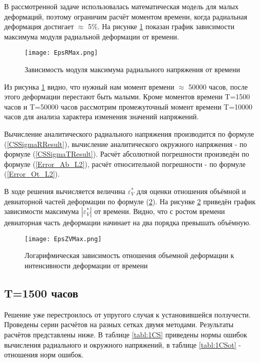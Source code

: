 \documentclass[a4paper,14pt]{extarticle}
\begin{document}
В рассмотренной задаче использовалась математическая модель для малых деформаций, поэтому ограничим расчёт моментом времени, когда радиальная деформация достигает $\approx$ 5$\%$. На рисунке \ref{EpsRMax} показан график зависимости максимума модуля радиальной деформации от времени. 
\newpage

\begin{figure}[ht]
\begin{center}
\texttt{[image: EpsRMax.png]}
\caption{Зависимость модуля максимума радиального напряжения от времени}
\label{EpsRMax}
\end{center}
\end{figure}

Из рисунка \ref{EpsRMax} видно, что нужный нам момент времени $\approx$ 50000 часов, после этого деформации перестают быть малыми. Кроме моментов времени T=1500 часов и T=50000 часов рассмотрим промежуточный момент времени T=10000 часов для анализа характера изменения значений напряжений.

Вычисление аналитического радиального напряжения производится по формуле (\ref{CSSigmaRResult}), вычисление аналитического окружного напряжения - по формуле (\ref{CSSigmaTResult}). Расчёт абсолютной погрешности произведён по формуле (\ref{Error_Ab_L2}), расчёт относительной погрешности - по формуле (\ref{Error_Ot_L2}).

В ходе решения вычисляется величина $\varepsilon^{*}_{V}$ для оценки отношения объёмной и девиаторной частей деформации по формуле (\ref{EpsZV}). На рисунке \ref{EpsZV} приведён график зависимости максимума $|\varepsilon^{*}_{V}|$ от времени. Видно, что с ростом времени девиаторная часть деформации начинает на два порядка превышать объёмную.

\begin{figure}[ht]
\begin{center}
\texttt{[image: EpsZVMax.png]}
\caption{Логарифмическая зависимость отношения объемной деформации к интенсивности деформации от времени}
\label{EpsZV}
\end{center}
\end{figure}

\newpage	

\subsection{T=1500 часов}

Решение уже перестроилось от упругого случая к установившейся ползучести. Проведены серии расчётов на разных сетках двумя методами. Результаты расчётов представлены ниже. В таблице \ref{tabl:1CS} приведены нормы ошибок вычисления радиального и окружного напряжений, в таблице \ref{tabl:1CSot} - отношения норм ошибок.
\end{document}

